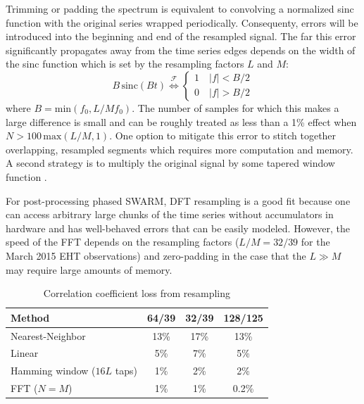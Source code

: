 Trimming or padding the spectrum is equivalent to convolving a normalized sinc function with the original series 
wrapped periodically.  Consequenty, errors will be introduced into the beginning and end of the
resampled signal.  The far this error significantly propagates away from the time series edges depends on the 
width of the sinc function which is set by the resampling factors $L$ and $M$: 
\begin{equation} \label{eq:sinc}
B\,\mathrm{sinc}(B t) \overset{\mathcal{F}}{\Longleftrightarrow} \begin{cases} 1 \quad |f| < B/2 \\ 0 \quad |f| > B/2 \end{cases}
\end{equation}
where $B = \mathrm{min}(f_0,L/Mf_0)$.  
The number of samples for which this makes a large difference is small and can be roughly treated as less than a 
1\% effect when $N > 100\,\mathrm{max}(L/M,1)$.  One option to mitigate this error to stitch together 
overlapping, resampled segments \citep{bi11} which requires more computation and memory.  A second strategy is to 
multiply the original signal by some tapered window function \citep{fraser89}.

For post-processing phased SWARM, DFT resampling is a good fit because one can access arbitrary large chunks of 
the time series without accumulators in hardware and has well-behaved errors
that can be easily modeled.  However, the speed of the FFT depends on the resampling factors ($L/M = 32/39$ for 
the March 2015 EHT observations) and zero-padding in the case that the $L\gg M$ may require large amounts of 
memory.

\begin{table}
\begin{center}
\centering
\caption{Correlation coefficient loss from resampling \label{tab:loss}}
\begin{threeparttable}
\begin{tabular}{l|ccc}
\toprule
Method & 64/39 & 32/39 & 128/125 \\
\midrule
Nearest-Neighbor            & 13\% & 17\% & 13\% \\
Linear                      &  5\% &  7\% &  5\% \\
Hamming window ($16L$ taps) &  1\% &  2\% &  2\% \\
FFT ($N=M$)                 &  1\% &  1\% & 0.2\% \\
\bottomrule
\end{tabular}
\end{threeparttable}
\end{center}
\end{table}

